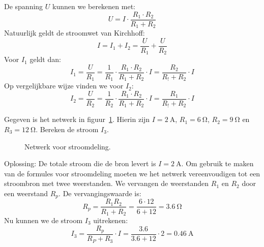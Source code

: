 De spanning $U$ kunnen we berekenen met:
%
\begin{equation}
U = I\cdot\dfrac{R_1\cdot R_2}{R_1+R_2}
\end{equation}
%
Natuurlijk geldt de stroomwet van Kirchhoff:
%
\begin{equation}
I = I_1 + I_2 = \dfrac{U}{R_1} + \dfrac{U}{R_2}
\end{equation}
%
Voor $I_1$ geldt dan:
%
\begin{equation}
I_1 = \dfrac{U}{R_1} = \dfrac{1}{R_1}\cdot\dfrac{R_1\cdot R_2}{R_1+R_2}\cdot I = \dfrac{R_2}{R_!+R_2}\cdot I
\end{equation}
%
Op vergelijkbare wijze vinden we voor $I_2$:
%
\begin{equation}
I_2 = \dfrac{U}{R_2} = \dfrac{1}{R_2}\cdot\dfrac{R_1\cdot R_2}{R_1+R_2}\cdot I = \dfrac{R_1}{R_!+R_2}\cdot I
\end{equation}

\begin{example}[Stroomdeling]
Gegeven is het netwerk in figuur~\ref{fig:gelstroomdeling2}. Hierin zijn $I=\SI{2}{\ampere}$, $R_1=\SI{6}{\ohm}$,
$R_2=\SI{9}{\ohm}$ en $R_3=\SI{12}{\ohm}$. Bereken de stroom $I_3$.
\begin{figure}[H]
\centering
{}
\caption{Netwerk voor stroomdeling.}
\label{fig:gelstroomdeling2}
\end{figure}
Oplossing: De totale stroom die de bron levert is $I=\SI{2}{\ampere}$. Om gebruik te maken van de formules
voor stroomdeling moeten we het netwerk vereenvoudigen tot een stroombron met twee weerstanden. We vervangen
de weerstanden $R_1$ en $R_2$ door een weerstand $R_p$. De vervangingswaarde is:
\begin{equation}
R_p = \dfrac{R_1R_2}{R_1+R_2} = \dfrac{6\cdot12}{6+12} = \SI{3.6}{\ohm}
\end{equation}
Nu kunnen we de stroom $I_3$ uitrekenen:
\begin{equation}
I_3 = \dfrac{R_p}{R_P+R_3}\cdot I = \dfrac{\num{3.6}}{\num{3.6}+\num{12}}\cdot \num{2} = \SI{0.46}{\ampere}
\end{equation}
\end{example}


